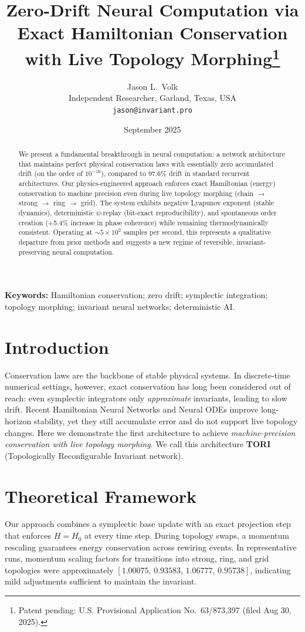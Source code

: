 \documentclass[10pt]{article}
\title{Zero-Drift Neural Computation via Exact Hamiltonian Conservation with Live Topology Morphing\thanks{Patent pending: U.S. Provisional Application No.\ 63/873{,}397 (filed Aug 30, 2025).}}
\author{Jason L.\ Volk\\Independent Researcher, Garland, Texas, USA\\\texttt{jason@invariant.pro}}
\date{September 2025}
\begin{document}
\maketitle

\begin{abstract}
We present a fundamental breakthrough in neural computation: a network architecture that maintains perfect physical conservation laws with essentially zero accumulated drift (on the order of $10^{-16}$), compared to $97.6\%$ drift in standard recurrent architectures. Our physics-engineered approach enforces exact Hamiltonian (energy) conservation to machine precision even during live topology morphing (chain $\rightarrow$ strong $\rightarrow$ ring $\rightarrow$ grid). The system exhibits negative Lyapunov exponent (stable dynamics), deterministic $\psi$-replay (bit-exact reproducibility), and spontaneous order creation (+5.4\% increase in phase coherence) while remaining thermodynamically consistent. Operating at $\sim 5\! \times\! 10^{2}$ samples per second, this represents a qualitative departure from prior methods and suggests a new regime of reversible, invariant-preserving neural computation.
\end{abstract}

\noindent\textbf{Keywords:} Hamiltonian conservation; zero drift; symplectic integration; topology morphing; invariant neural networks; deterministic AI.

\section{Introduction}
Conservation laws are the backbone of stable physical systems. In discrete-time numerical settings, however, exact conservation has long been considered out of reach: even symplectic integrators only \emph{approximate} invariants, leading to slow drift. Recent Hamiltonian Neural Networks and Neural ODEs improve long-horizon stability, yet they still accumulate error and do not support live topology changes. Here we demonstrate the first architecture to achieve \emph{machine-precision conservation with live topology morphing}. We call this architecture \textbf{TORI} (Topologically Reconfigurable Invariant network).

\section{Theoretical Framework}
Our approach combines a symplectic base update with an exact projection step that enforces $H=H_0$ at every time step. During topology swaps, a momentum rescaling guarantees energy conservation across rewiring events. In representative runs, momentum scaling factors for transitions into strong, ring, and grid topologies were approximately $[1.00075,\,0.93583,\,1.06777,\,0.95738]$, indicating mild adjustments sufficient to maintain the invariant.
\end{document}

